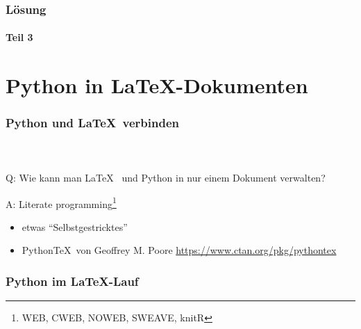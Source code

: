 \documentclass[12pt,ngerman]{beamer}
\newcounter{Aufgabe}
\begin{document}
\begin{frame}[fragile]
\frametitle{Lösung}
\framesubtitle{Teil 3}

 

\end{frame}

\section{Python in \LaTeX-Dokumenten}

\begin{frame}
\frametitle{Python und \LaTeX\ verbinden}
\framesubtitle{~}

Q: Wie kann man \LaTeX~ und Python in nur einem Dokument verwalten?

A: Literate programming\footnote{WEB, CWEB, NOWEB, SWEAVE, knitR}

\begin{itemize}
\item etwas \enquote{Selbstgestricktes}
\item Python\TeX\ von Ge­of­frey M. Poore \url{https://www.ctan.org/pkg/pythontex}
\end{itemize}
\end{frame}

\begin{frame}
\frametitle{Python im \LaTeX-Lauf}

\begin{center}
\end{center}

\end{frame}
\end{document}
